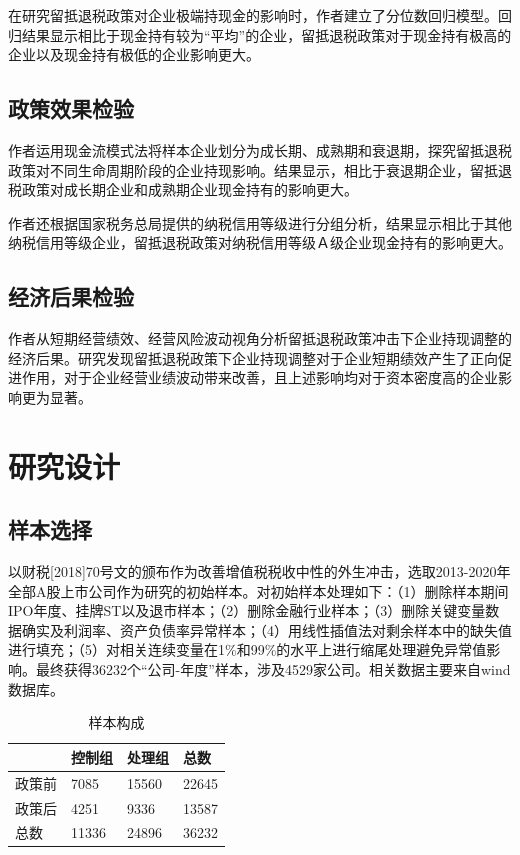 \documentclass{article}
\begin{document}
在研究留抵退税政策对企业极端持现金的影响时，作者建立了分位数回归模型。回归结果显示相比于现金持有较为“平均”的企业，留抵退税政策对于现金持有极高的企业以及现金持有极低的企业影响更大。

\subsection{政策效果检验}
\indent 作者运用现金流模式法将样本企业划分为成长期、成熟期和衰退期，探究留抵退税政策对不同生命周期阶段的企业持现影响。结果显示，相比于衰退期企业，留抵退税政策对成长期企业和成熟期企业现金持有的影响更大。

作者还根据国家税务总局提供的纳税信用等级进行分组分析，结果显示相比于其他纳税信用等级企业，留抵退税政策对纳税信用等级Ａ级企业现金持有的影响更大。

\subsection{经济后果检验}
\indent 作者从短期经营绩效、经营风险波动视角分析留抵退税政策冲击下企业持现调整的经济后果。研究发现留抵退税政策下企业持现调整对于企业短期绩效产生了正向促进作用，对于企业经营业绩波动带来改善，且上述影响均对于资本密度高的企业影响更为显著。

\section{研究设计}
\subsection{样本选择}
以财税[2018]70号文的颁布作为改善增值税税收中性的外生冲击，选取2013-2020年全部A股上市公司作为研究的初始样本。对初始样本处理如下：（1）删除样本期间IPO年度、挂牌ST以及退市样本；（2）删除金融行业样本；（3）删除关键变量数据确实及利润率、资产负债率异常样本；（4）用线性插值法对剩余样本中的缺失值进行填充；（5）对相关连续变量在1\%和99\%的水平上进行缩尾处理避免异常值影响。最终获得36232个“公司-年度”样本，涉及4529家公司。相关数据主要来自wind数据库。

\begin{table}[H]
\centering
\caption{样本构成}
\begin{tabular}{l|ll|l}
    & 控制组   & 处理组   & 总数    \\ \hline
政策前 & 7085  & 15560 & 22645 \\
政策后 & 4251  & 9336  & 13587 \\ \hline
总数  & 11336 & 24896 & 36232
\end{tabular}
\end{table}
\end{document}
